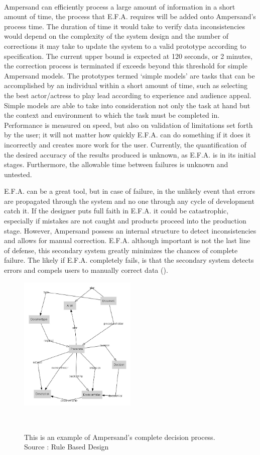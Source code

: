 \documentclass[12pt]{report}
\begin{document}
\paragraph*{}
Ampersand can efficiently process a large amount of information in a short amount of time, the 
process that E.F.A. requires will be added onto Ampersand’s process time. The duration of time it 
would take to verify data inconsistencies would depend on the complexity of the system design and 
the number of corrections it may take to update the system to a valid prototype according to 
specification. The current upper bound is expected at 120 seconds, or 2 minutes, the correction 
process is terminated if exceeds beyond this threshold for simple Ampersand models. The prototypes 
termed ‘simple models’ are tasks that can be accomplished by an individual within a short amount of 
time, such as selecting the best actor/actress to play lead according to experience and audience 
appeal. Simple models are able to take into consideration not only the task at hand but the context 
and environment to which the task must be completed in. Performance is measured on speed, but also 
on validation of limitations set forth by the user; it will not matter how quickly E.F.A. can do 
something if it does it incorrectly and creates more work for the user. Currently, the 
quantification of the desired accuracy of the results produced is unknown, as E.F.A. is in its 
initial stages. Furthermore, the allowable time between failures is unknown and untested.

E.F.A. can be a great tool, but in case of failure, in the unlikely event that errors are 
propagated through the system and no one through any cycle of development catch it. If the designer 
puts full faith in E.F.A. it could be catastrophic, especially if mistakes are not caught and 
products proceed into the production stage. However, Ampersand possess an internal structure to 
detect inconsistencies and allows for manual correction. E.F.A. although important is not the last 
line of defense, this secondary system greatly minimizes the chances of complete failure. The 
likely if E.F.A. completely fails, is that the secondary system detects errors and compels users to 
manually correct data (\cite[153]{RBD}). 

\begin{figure}
	\centering
	\includegraphics[width=0.5\textwidth]{../figures/Ampersanddecision}
	\caption{This is an example of Ampersand's complete decision process. Source : Rule Based 
	Design}~\label{fig:figure5}
\end{figure}
\end{document}
